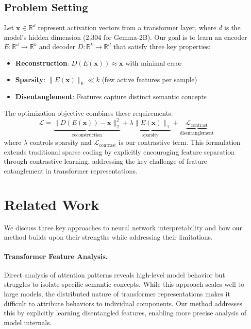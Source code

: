 \documentclass{article} %
\begin{document}
\subsection{Problem Setting}
Let $\mathbf{x} \in \mathbb{R}^d$ represent activation vectors from a transformer layer, where $d$ is the model's hidden dimension (2,304 for Gemma-2B). Our goal is to learn an encoder $E: \mathbb{R}^d \rightarrow \mathbb{R}^k$ and decoder $D: \mathbb{R}^k \rightarrow \mathbb{R}^d$ that satisfy three key properties:

\begin{itemize}
    \item \textbf{Reconstruction}: $D(E(\mathbf{x})) \approx \mathbf{x}$ with minimal error
    \item \textbf{Sparsity}: $\|E(\mathbf{x})\|_0 \ll k$ (few active features per sample)
    \item \textbf{Disentanglement}: Features capture distinct semantic concepts
\end{itemize}

The optimization objective combines these requirements:
\begin{equation}
    \mathcal{L} = \underbrace{\|D(E(\mathbf{x})) - \mathbf{x}\|_2^2}_{\text{reconstruction}} + \underbrace{\lambda\|E(\mathbf{x})\|_1}_{\text{sparsity}} + \underbrace{\mathcal{L}_{\text{contrast}}}_{\text{disentanglement}}
\end{equation}
where $\lambda$ controls sparsity and $\mathcal{L}_{\text{contrast}}$ is our contrastive term. This formulation extends traditional sparse coding by explicitly encouraging feature separation through contrastive learning, addressing the key challenge of feature entanglement in transformer representations.

\section{Related Work}
\label{sec:related}

We discuss three key approaches to neural network interpretability and how our method builds upon their strengths while addressing their limitations.

\paragraph{Transformer Feature Analysis.} Direct analysis of attention patterns \cite{vaswani2017attention} reveals high-level model behavior but struggles to isolate specific semantic concepts. While this approach scales well to large models, the distributed nature of transformer representations makes it difficult to attribute behaviors to individual components. Our method addresses this by explicitly learning disentangled features, enabling more precise analysis of model internals.
\end{document}
